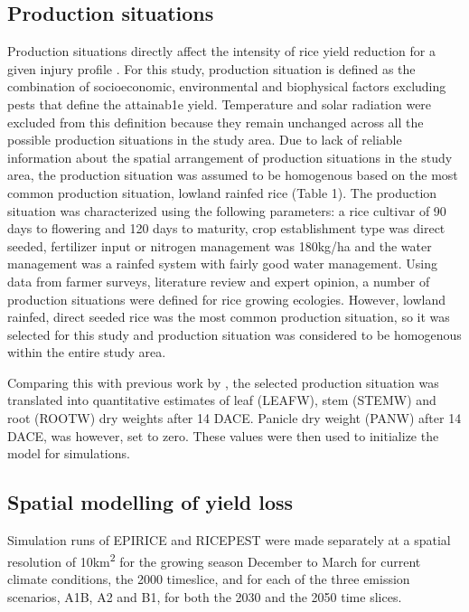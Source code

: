 \documentclass[preprint,12pt]{elsarticle}
\begin{document}
\subsection{Production situations}
Production situations directly affect the intensity of rice yield reduction for a given injury profile \cite{Savary2000}. For this study, production situation is defined as the combination of socioeconomic, environmental and biophysical factors excluding pests that define the attainab1e yield. Temperature and solar radiation were excluded from this definition because they remain unchanged across all the possible production situations in the study area. Due to lack of reliable information about the spatial arrangement of production situations in the study area, the production situation was assumed to be homogenous based on the most common production situation, lowland rainfed rice \cite{Diagne2013} (Table 1). The production situation was characterized using the following parameters: a rice cultivar of 90 days to flowering and 120 days to maturity, crop establishment type was direct seeded, fertilizer input or nitrogen management was 180kg/ha and the water management was a rainfed system with fairly good water management. Using data from farmer surveys, literature review and expert opinion, a number of production situations were defined for rice growing ecologies. However, lowland rainfed, direct seeded rice was the most common production situation, so it  was selected for this study and production situation was considered to be homogenous within the entire study area. 

Comparing this with previous work by \citet{Willocquet2002}, the selected production situation was translated into quantitative estimates of leaf (LEAFW), stem (STEMW) and root (ROOTW) dry weights after 14 DACE. Panicle dry weight (PANW) after 14 DACE, was however, set to zero. These values were then used to initialize the model for simulations. 

\subsection{Spatial modelling of yield loss}
Simulation runs of EPIRICE and RICEPEST were made separately at a spatial resolution of 10km\textsuperscript{2} for the growing season December to March for current climate conditions, the 2000 timeslice, and for each of the three emission scenarios, A1B, A2 and B1, for both the 2030 and the 2050 time slices.
\end{document}
